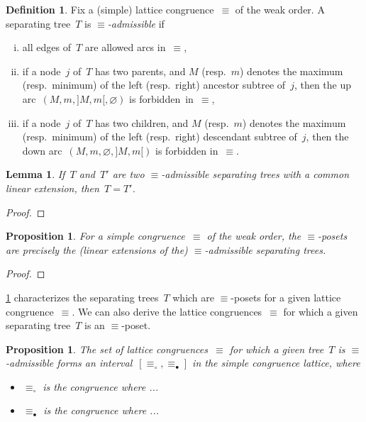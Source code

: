 \documentclass{amsart}
\newtheorem{proposition}[theorem]{Proposition}
\newtheorem{lemma}[theorem]{Lemma}
\theoremstyle{definition}
\newtheorem{definition}[theorem]{Definition}
\newcommand{\darkblue}{\color{darkblue}} %
\newcommand{\defn}[1]{\textsl{\darkblue #1}} %
\newcommand{\vincent}[1]{\todo[color=blue!30]{#1 \\ \hfill --- V.}}
\begin{document}
\begin{definition}
\label{def:admissibleSeparatingTrees}
Fix a (simple) lattice congruence~$\equiv$ of the weak order.
A separating tree~$T$ is \defn{$\equiv$-admissible} if
\begin{enumerate}[(i)]
\item all edges of~$T$ are allowed arcs in~$\equiv$,
\item if a node~$j$ of~$T$ has two parents, and $M$ (resp.~$m$) denotes the maximum (resp.~minimum) of the left (resp.~right) ancestor subtree of~$j$, then the up arc~$(M, m, {]M,m[}, \varnothing)$ is forbidden~in~$\equiv$,
\item if a node~$j$ of~$T$ has two children, and $M$ (resp.~$m$) denotes the maximum (resp.~minimum) of the left (resp.~right) descendant subtree of~$j$, then the down arc~$(M, m, \varnothing, {]M,m[})$ is forbidden in~$\equiv$.
\end{enumerate}
\end{definition}

\begin{lemma}
If~$T$ and~$T'$ are two $\equiv$-admissible separating trees with a common linear extension, then~${T = T'}$.
\end{lemma}

\begin{proof}
\vincent{todo}
\end{proof}

\begin{proposition}
\label{prop:admissibleSeparatingTrees}
For a simple congruence~$\equiv$ of the weak order, the $\equiv$-posets are precisely the (linear extensions of the) $\equiv$-admissible separating trees.
\end{proposition}

\begin{proof}
\vincent{todo}
\end{proof}


\cref{prop:admissibleSeparatingTrees} characterizes the separating trees~$T$ which are $\equiv$-posets for a given lattice congruence~$\equiv$.
We can also derive the lattice congruences~$\equiv$ for which a given separating tree~$T$ is an $\equiv$-poset.

\begin{proposition}
\label{prop:whichCongruences}
The set of lattice congruences~$\equiv$ for which a given tree~$T$ is $\equiv$-admissible forms an interval~$[\equiv_\circ, \equiv_\bullet]$ in the simple congruence lattice, where
\begin{itemize}
\item $\equiv_\circ$ is the congruence where ...
\item $\equiv_\bullet$ is the congruence where ...
\end{itemize}
\vincent{todo}
\end{proposition}
\end{document}

